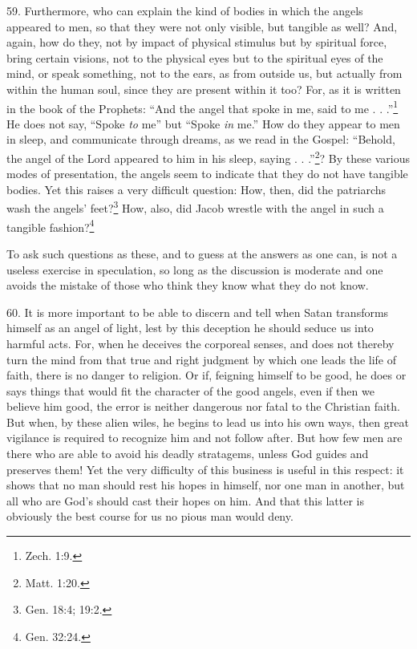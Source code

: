 59. Furthermore, who can explain the kind of bodies in which the angels appeared to men, so that they were not only visible, but tangible as well? And, again, how do they, not by impact of physical stimulus but by spiritual force, bring certain visions, not to the physical eyes but to the spiritual eyes of the mind, or speak something, not to the ears, as from outside us, but actually from within the human soul, since they are present within it too? For, as it is written in the book of the Prophets: ``And the angel that spoke in me, said to me . . .''\footnote{Zech. 1:9.} He does not say, ``Spoke \emph{to} me'' but ``Spoke \emph{in} me.'' How do they appear to men in sleep, and communicate through dreams, as we read in the Gospel: ``Behold, the angel of the Lord appeared to him in his sleep, saying . . .''\footnote{Matt. 1:20.}? By these various modes of presentation, the angels seem to indicate that they do not have tangible bodies. Yet this raises a very difficult question: How, then, did the patriarchs wash the angels' feet?\footnote{Gen. 18:4; 19:2.} How, also, did Jacob wrestle with the angel in such a tangible fashion?\footnote{Gen. 32:24.}

To ask such questions as these, and to guess at the answers as one can, is not a useless exercise in speculation, so long as the discussion is moderate and one avoids the mistake of those who think they know what they do not know.


60. It is more important to be able to discern and tell when Satan transforms himself as an angel of light, lest by this deception he should seduce us into harmful acts. For, when he deceives the corporeal senses, and does not thereby turn the mind from that true and right judgment by which one leads the life of faith, there is no danger to religion. Or if, feigning himself to be good, he does or says things that would fit the character of the good angels, even if then we believe him good, the error is neither dangerous nor fatal to the Christian faith. But when, by these alien wiles, he begins to lead us into his own ways, then great vigilance is required to recognize him and not follow after. But how few men are there who are able to avoid his deadly stratagems, unless God guides and preserves them! Yet the very difficulty of this business is useful in this respect: it shows that no man should rest his hopes in himself, nor one man in another, but all who are God's should cast their hopes on him. And that this latter is obviously the best course for us no pious man would deny.


